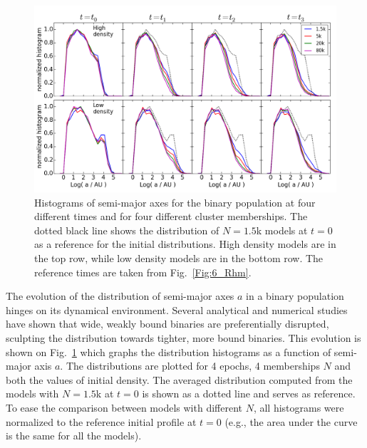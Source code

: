 \begin{figure}
\begin{center}
\includegraphics[width=\textwidth]{Figures/6_SMAxis_histogram}
\caption[Semi-major axis distribution for all models and 4 epochs]{Histograms of semi-major axes for the binary population at four different times and for four different cluster memberships. The dotted black line shows the distribution of $N = 1.5$k models at $t=0$ as a reference for the initial distributions. High density models are in the top row, while low density models are in the bottom row. The reference times are taken from Fig.~\ref{Fig:6_Rhm}.}
\label{Fig:6_SMAxis_histogram}
\end{center}
\end{figure}

The evolution of the distribution of semi-major axes $a $ %
in a binary population hinges on its dynamical environment. Several analytical and numerical studies
\citep{Heggie1975,Kroupa1995,Kroupa1995a,Vesperini1996,Heggie2006,Parker2009,Parker2011} have shown that wide, weakly bound binaries are preferentially disrupted, sculpting the distribution towards tighter, more bound binaries. 
This evolution is shown on Fig.~\ref{Fig:6_SMAxis_histogram} which graphs the distribution histograms as a function of semi-major axis $a$. The distributions are plotted for 4 epochs, 4 memberships $N$ and both the values of initial density. The averaged distribution computed from the models with $N = 1.5$k at $t=0$ is shown as a dotted line and serves as reference. To ease the comparison between models with different $N$, all histograms were normalized to the reference initial profile at $t=0$ (e.g., the area under the curve is the same for all the models).


